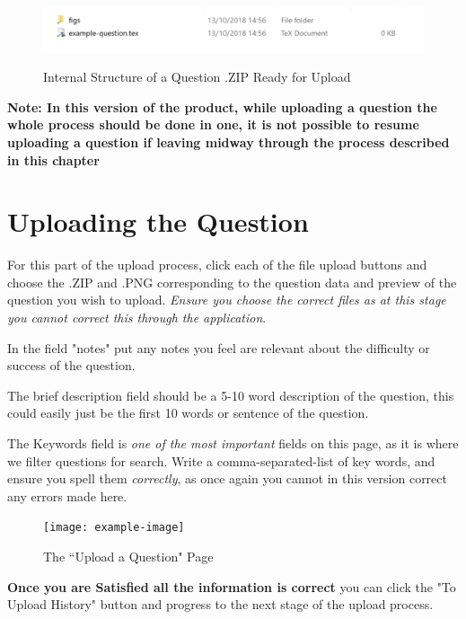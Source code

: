 \documentclass[12pt, a4paper, titlepage]{book}
\begin{document}
\begin{figure}[htp]
\centering
\includegraphics[width = 14cm, height = 2cm]{exampledir.PNG}
\caption{Internal Structure of a Question .ZIP Ready for Upload}
\end{figure}

\textbf{Note: In this version of the product, while uploading a question the whole process should be done in one, it is not possible to resume uploading a question if leaving midway through the process described in this chapter}
\pagebreak
\section{Uploading the Question}

For this part of the upload process, click each of the file upload buttons and choose the .ZIP and .PNG corresponding to the question data and preview of the question you wish to upload. \textit{Ensure you choose the correct files as at this stage you cannot correct this through the application}.\par
In the field "notes" put any notes you feel are relevant about the difficulty or success of the question.\par The brief description field should be a 5-10 word description of the question, this could easily just be the first 10 words or sentence of the question.\par The Keywords field is \textit{one of the most important} fields on this page, as it is where we filter questions for search. Write a comma-separated-list of key words, and ensure you spell them \textit{correctly}, as once again you cannot in this version correct any errors made here.
\begin{figure}[H]
\centering
\texttt{[image: example-image]}
\label{fig:upload}
\caption{The ``Upload a Question" Page}
\end{figure}
\textbf{Once you are Satisfied all the information is correct} you can click the "To Upload History" button and progress to the next stage of the upload process.\pagebreak
\end{document}

